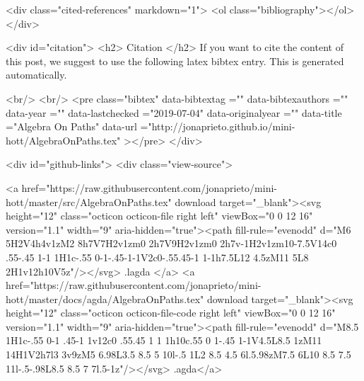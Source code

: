   <div class="cited-references" markdown="1">
  <ol class="bibliography"></ol>
  </div>


  
  <div id="citation">
  <h2> Citation </h2>
  If you want to cite the content of this post,
  we suggest to use the following latex bibtex entry.
  This is generated automatically.

  <br/>
  <br/>
  <pre class="bibtex"
       data-bibtextag =""
       data-bibtexauthors =""
       data-year =""
       data-lastchecked ="2019-07-04"
       data-originalyear =""
       data-title ="Algebra On Paths"
       data-url ="http://jonaprieto.github.io/mini-hott/AlgebraOnPaths.tex"
  ></pre>
  </div>
  

  <div id="github-links">
    <div class="view-source">
      
        <a href="https://raw.githubusercontent.com/jonaprieto/mini-hott/master/src/AlgebraOnPaths.tex" download target="_blank"><svg height="12" class="octicon octicon-file right left" viewBox="0 0 12 16" version="1.1" width="9" aria-hidden="true"><path fill-rule="evenodd" d="M6 5H2V4h4v1zM2 8h7V7H2v1zm0 2h7V9H2v1zm0 2h7v-1H2v1zm10-7.5V14c0 .55-.45 1-1 1H1c-.55 0-1-.45-1-1V2c0-.55.45-1 1-1h7.5L12 4.5zM11 5L8 2H1v12h10V5z"/></svg> .lagda </a>
        <a href="https://raw.githubusercontent.com/jonaprieto/mini-hott/master/docs/agda/AlgebraOnPaths.tex" download target="_blank"><svg height="12" class="octicon octicon-file-code right left" viewBox="0 0 12 16" version="1.1" width="9" aria-hidden="true"><path fill-rule="evenodd" d="M8.5 1H1c-.55 0-1 .45-1 1v12c0 .55.45 1 1 1h10c.55 0 1-.45 1-1V4.5L8.5 1zM11 14H1V2h7l3 3v9zM5 6.98L3.5 8.5 5 10l-.5 1L2 8.5 4.5 6l.5.98zM7.5 6L10 8.5 7.5 11l-.5-.98L8.5 8.5 7 7l.5-1z"/></svg> .agda</a>
      
